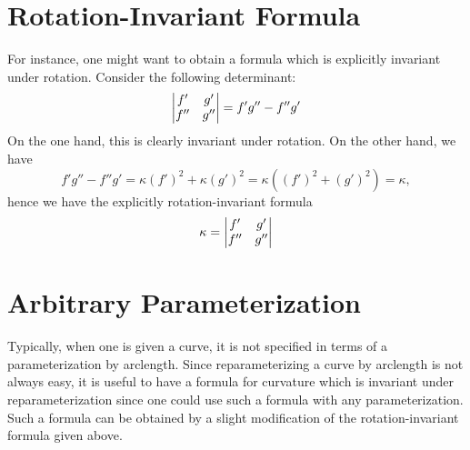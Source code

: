 \documentclass[12pt]{article}
\begin{document}
\section{Rotation-Invariant Formula}

For instance, one might want to obtain a formula which is explicitly invariant under rotation.  Consider the following determinant:
 \[ \left| \begin{matrix} f' & g' \cr f'' & g'' \end{matrix} \right| = f' g'' - f'' g' \]
On the one hand, this is clearly invariant under rotation.  On the other hand, we have
 \[ f' g'' - f'' g' = \kappa (f')^2 + \kappa (g')^2 = \kappa \left( (f')^2 + (g')^2 \right) = \kappa ,\]
hence we have the explicitly rotation-invariant formula
 \[ \kappa = \left| \begin{matrix} f' & g' \cr f'' & g'' \end{matrix} \right| \]

\section{Arbitrary Parameterization}

Typically, when one is given a curve, it is not specified in terms of a parameterization by arclength.  Since reparameterizing a curve by arclength is not always easy, it is useful to have a formula for curvature which is invariant under reparameterization since one could use such a formula with any parameterization.  Such a formula can be obtained by a slight modification of the rotation-invariant formula given above.
\end{document}
